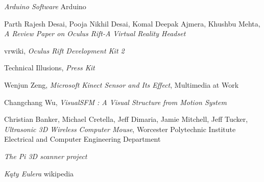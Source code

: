 \begin{thebibliography}{99}
   \textit{Arduino Software}
  Arduino

    Parth Rajesh Desai, Pooja Nikhil Desai, Komal Deepak Ajmera, Khushbu Mehta,
  \textit{A Review Paper on Oculus Rift-A Virtual Reality Headset}

    vrwiki,
  \textit{Oculus Rift Development Kit 2}
  
   Technical Illusions,
  \textit{Press Kit}

   Wenjun Zeng,
  \textit{Microsoft Kinect Sensor and Its Effect}, Multimedia at Work

   Changchang Wu,
  \textit{VisualSFM : A Visual Structure from Motion System}

    Christian Banker, Michael Cretella, Jeff Dimaria, Jamie Mitchell, Jeff Tucker, 
  \textit{Ultrasonic 3D Wireless Computer Mouse}, 
  Worcester Polytechnic Institute Electrical and Computer Engineering Department 

  \textit{The Pi 3D scanner project}

  \textit{Kąty Eulera} wikipedia
  
  
\end{thebibliography}
